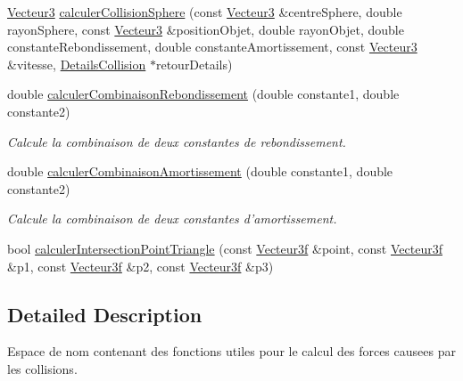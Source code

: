 \begin{DoxyCompactItemize}
\item 
\hyperlink{group__utilitaire_ga541aa4837ad9250d3a248dc82ee9ad4d}{Vecteur3} \hyperlink{namespaceaidecollision_a32afc8d28fb424bc014af013be76c9fa}{calculer\-Collision\-Sphere} (const \hyperlink{group__utilitaire_ga541aa4837ad9250d3a248dc82ee9ad4d}{Vecteur3} \&centre\-Sphere, double rayon\-Sphere, const \hyperlink{group__utilitaire_ga541aa4837ad9250d3a248dc82ee9ad4d}{Vecteur3} \&position\-Objet, double rayon\-Objet, double constante\-Rebondissement, double constante\-Amortissement, const \hyperlink{group__utilitaire_ga541aa4837ad9250d3a248dc82ee9ad4d}{Vecteur3} \&vitesse, \hyperlink{classaidecollision_1_1_details_collision}{Details\-Collision} $\ast$retour\-Details)
\item 
double \hyperlink{namespaceaidecollision_a6237077a29518539015295311e39e2cc}{calculer\-Combinaison\-Rebondissement} (double constante1, double constante2)
\begin{DoxyCompactList}\small\item\em Calcule la combinaison de deux constantes de rebondissement. \end{DoxyCompactList}\item 
double \hyperlink{namespaceaidecollision_a617db5046c54f02f5bfa501aadc368d8}{calculer\-Combinaison\-Amortissement} (double constante1, double constante2)
\begin{DoxyCompactList}\small\item\em Calcule la combinaison de deux constantes d'amortissement. \end{DoxyCompactList}\item 
bool \hyperlink{namespaceaidecollision_a680fa1bfbc3e0d711f5934ec4602e228}{calculer\-Intersection\-Point\-Triangle} (const \hyperlink{group__utilitaire_ga6b2956069f76c7e27df4f79f87e5a48c}{Vecteur3f} \&point, const \hyperlink{group__utilitaire_ga6b2956069f76c7e27df4f79f87e5a48c}{Vecteur3f} \&p1, const \hyperlink{group__utilitaire_ga6b2956069f76c7e27df4f79f87e5a48c}{Vecteur3f} \&p2, const \hyperlink{group__utilitaire_ga6b2956069f76c7e27df4f79f87e5a48c}{Vecteur3f} \&p3)
\end{DoxyCompactItemize}


\subsection{Detailed Description}
Espace de nom contenant des fonctions utiles pour le calcul des forces causees par les collisions. 

